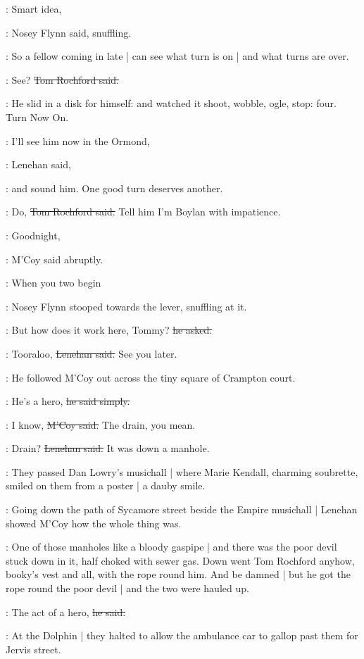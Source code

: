 \nosey:
Smart idea,

:
Nosey Flynn said, snuffling.%

\nosey:
So a fellow coming in late |
can see what turn is on |
and what turns are over.

\rochford:
See?
\sout{Tom Rochford said.}

:
He slid in a disk for himself:
and watched it
shoot,
wobble,
ogle,
stop:
four.
Turn Now On.

\lenehan:
I'll see him now in the Ormond,

:
Lenehan said,

\lenehan:
and sound him.
One good turn deserves another.

\rochford:
Do,
\sout{Tom Rochford said.}
Tell him I'm Boylan with impatience.

\mcoy:
Goodnight,

:
M'Coy said abruptly.

\mcoy:
When you two begin

:
Nosey Flynn stooped towards the lever,
snuffling at it.

\nosey:
But how does it work here, Tommy?
\sout{he asked.}

\lenehan:
Tooraloo,
\sout{Lenehan said.}%
See you later.

:
He followed M'Coy out
across the tiny square of Crampton court.

\lenehan:
He's a hero,
\sout{he said simply.}

\mcoy:
I know,
\sout{M'Coy said.}
The drain, you mean.

\lenehan:
Drain?
\sout{Lenehan said.}
It was down a manhole.

:
They passed Dan Lowry's musichall |
where Marie Kendall,
charming soubrette,
smiled on them from a poster |
a dauby smile.

:
Going down the path of Sycamore street
beside the Empire musichall |
Lenehan showed M'Coy how the whole thing was.

\lenehan:
One of those manholes like a bloody gaspipe |
and there was the poor devil stuck down in it,
half choked with sewer gas.%
Down went Tom Rochford anyhow,
booky's vest and all,
with the rope round him.
And be damned |
but he got the rope round the poor devil |
and the two were hauled up.

\lenehan:
The act of a hero,
\sout{he said.}

:
At the Dolphin |
they halted to allow the ambulance car
to gallop past them for Jervis street.

